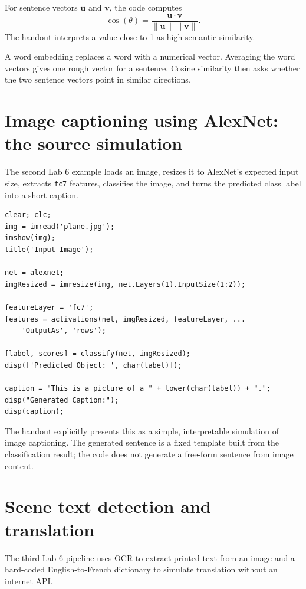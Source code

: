 For sentence vectors \(\mathbf{u}\) and \(\mathbf{v}\), the code computes
\[
\cos(\theta)=\frac{\mathbf{u}\cdot\mathbf{v}}
{\|\mathbf{u}\|\,\|\mathbf{v}\|}.
\]
The handout interprets a value close to 1 as high semantic similarity.

\begin{intuition}
A word embedding replaces a word with a numerical vector. Averaging the word vectors gives one rough vector for a sentence. Cosine similarity then asks whether the two sentence vectors point in similar directions.
\end{intuition}

\section{Image captioning using AlexNet: the source simulation}

The second Lab 6 example loads an image, resizes it to AlexNet's expected input size, extracts \texttt{fc7} features, classifies the image, and turns the predicted class label into a short caption.

\begin{lstlisting}[style=mlmatlab]
clear; clc;
img = imread('plane.jpg');
imshow(img);
title('Input Image');

net = alexnet;
imgResized = imresize(img, net.Layers(1).InputSize(1:2));

featureLayer = 'fc7';
features = activations(net, imgResized, featureLayer, ...
    'OutputAs', 'rows');

[label, scores] = classify(net, imgResized);
disp(['Predicted Object: ', char(label)]);

caption = "This is a picture of a " + lower(char(label)) + ".";
disp("Generated Caption:");
disp(caption);
\end{lstlisting}

\begin{pitfall}
The handout explicitly presents this as a simple, interpretable simulation of image captioning. The generated sentence is a fixed template built from the classification result; the code does not generate a free-form sentence from image content.
\end{pitfall}

\section{Scene text detection and translation}

The third Lab 6 pipeline uses OCR to extract printed text from an image and a hard-coded English-to-French dictionary to simulate translation without an internet API.

